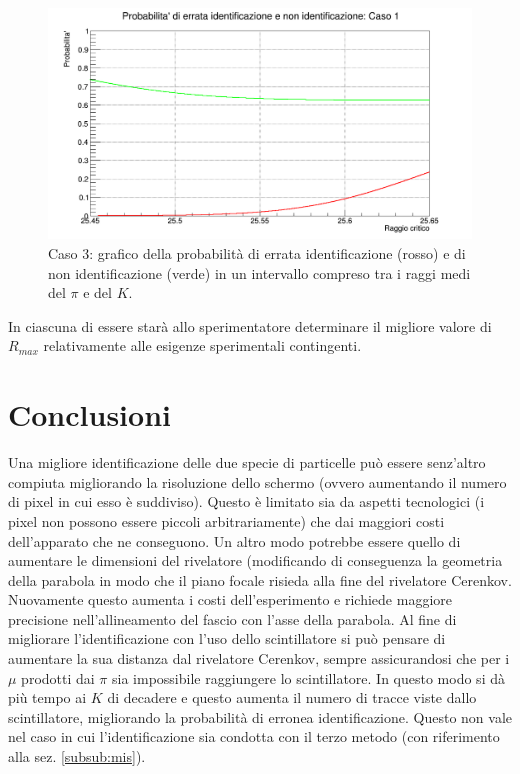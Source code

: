 \documentclass[8pt]{extarticle}
\begin{document}
\begin{figure}
\begin{center}
\includegraphics[scale=0.4]{non_vs_mis3DEFINITIVO}
\caption{Caso 3: grafico della probabilità di errata identificazione (rosso) e di non identificazione (verde) in un intervallo compreso tra i raggi medi del $\pi$ e del $K$.}
\end{center}
\end{figure}


In ciascuna di essere starà allo sperimentatore determinare il migliore valore di $R_{max}$ relativamente alle esigenze sperimentali contingenti.

\section{Conclusioni}
Una migliore identificazione delle due specie di particelle può essere senz'altro compiuta migliorando la risoluzione dello schermo (ovvero aumentando il numero di pixel in cui esso è suddiviso). Questo è limitato sia da aspetti tecnologici (i pixel non possono essere piccoli arbitrariamente) che dai maggiori costi dell'apparato che ne conseguono. Un altro modo potrebbe essere quello di aumentare le dimensioni del rivelatore (modificando di conseguenza la geometria della parabola in modo che il piano focale risieda alla fine del rivelatore Cerenkov. Nuovamente questo aumenta i costi dell'esperimento e richiede maggiore precisione nell'allineamento del fascio con l'asse della parabola. Al fine di migliorare l'identificazione con l'uso dello scintillatore si può pensare di aumentare la sua distanza dal rivelatore Cerenkov, sempre assicurandosi che per i $\mu$ prodotti dai $\pi$ sia impossibile raggiungere lo scintillatore. In questo modo si dà più tempo ai $K$ di decadere e questo aumenta il numero di tracce viste dallo scintillatore, migliorando la probabilità di erronea identificazione. Questo non vale nel caso in cui l'identificazione sia condotta con il terzo metodo (con riferimento alla sez. \ref{subsub:mis}).


\end{document}

